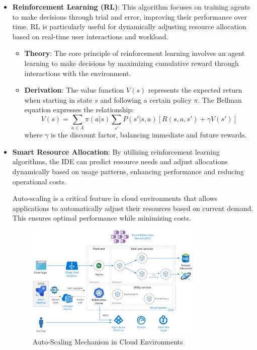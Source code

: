\documentclass[12pt,a4paper,final]{report}
\begin{document}
\begin{itemize}
    \item \textbf{Reinforcement Learning (RL)}: This algorithm focuses on training agents to make decisions through trial and error, improving their performance over time. RL is particularly useful for dynamically adjusting resource allocation based on real-time user interactions and workload.
    \begin{itemize}
        \item \textbf{Theory}: The core principle of reinforcement learning involves an agent learning to make decisions by maximizing cumulative reward through interactions with the environment.
        \item \textbf{Derivation}: The value function \( V(s) \) represents the expected return when starting in state \( s \) and following a certain policy \( \pi \). The Bellman equation expresses the relationship:
        \[
        V(s) = \sum_{a \in A} \pi(a|s) \sum_{s'} P(s'|s,a)[R(s,a,s') + \gamma V(s')]
        \]
        where \( \gamma \) is the discount factor, balancing immediate and future rewards.
    \end{itemize}

    \item \textbf{Smart Resource Allocation}: By utilizing reinforcement learning algorithms, the IDE can predict resource needs and adjust allocations dynamically based on usage patterns, enhancing performance and reducing operational costs.

    
\hspace{1cm}
Auto-scaling is a critical feature in cloud environments that allows applications to automatically adjust their resources based on current demand. This ensures optimal performance while minimizing costs.

\begin{figure}[h] %
    \centering
    \includegraphics[width=0.8\textwidth]{autoscaling.png} %
    \caption{Auto-Scaling Mechanism in Cloud Environments}
    \label{fig:autoscaling}
\end{figure}


\end{itemize}
\end{document}
